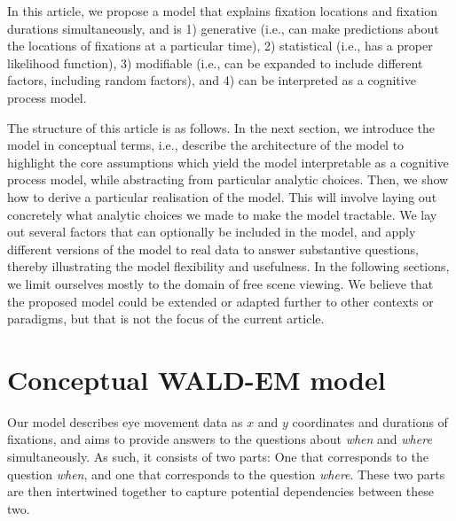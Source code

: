\documentclass{article}
\begin{document}
In this article, we propose a model that explains fixation locations and fixation durations simultaneously, and is 1) generative (i.e., can make predictions about the locations of fixations at a particular time), 2) statistical (i.e., has a proper likelihood function), 3) modifiable (i.e., can be expanded to include different factors, including  random factors), and 4) can be interpreted as a cognitive process model. 

The structure of this article is as follows. In the next section, we introduce the model in conceptual terms, i.e., describe the architecture of the model to highlight the core assumptions which yield the model interpretable as a cognitive process model, while abstracting from particular analytic choices. Then, we show how to derive a particular realisation of the model. This will involve laying out concretely what analytic choices we made to make the model tractable. We lay out several factors that can optionally be included in the model, and apply different versions of the model to real data to answer substantive questions, thereby illustrating the model flexibility and usefulness. In the following sections, we limit ourselves mostly to the domain of free scene viewing. We believe that the proposed model could be extended or adapted further to other contexts or paradigms, but that is not the focus of the current article.


\section{Conceptual WALD-EM model}

Our model describes eye movement data as $x$ and $y$ coordinates and durations of fixations, and aims to provide answers to the questions about \textit{when} and \textit{where} simultaneously. As such, it consists of two parts: One that corresponds to the question \textit{when}, and one that corresponds to the question \textit{where}. These two parts are then intertwined together to capture potential dependencies between these two.
\end{document}
